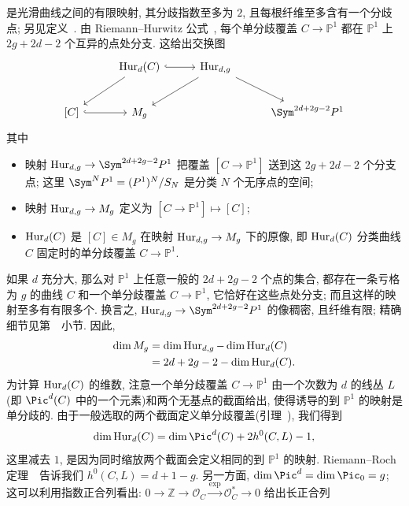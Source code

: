 是光滑曲线之间的有限映射, 其分歧指数至多为 $2$, 且每根纤维至多含有一个分歧点; 另见定义~. 由 Riemann--Hurwitz 公式~, 每个单分歧覆盖 $C\to\mathbb P^1$ 都在 $\mathbb P^1$ 上 $2g+2d-2$ 个互异的点处分支. 这给出交换图
\begin{equation}\label{src:1.1.2}
\begin{tikzcd}[column sep=2.8em,row sep=2.2em]
& \Hur_d(C)\arrow[r,hook]\arrow[dl] & \Hur_{d,g}\arrow[dl]\arrow[dr] &\\
{[C]}\arrow[r,hook] & M_g & & \Sym^{2d+2g-2}\mathbb P^1
\end{tikzcd}
\end{equation}
其中
\begin{itemize}
\item 映射 $\Hur_{d,g}\to\Sym^{2d+2g-2}\mathbb P^1$ 把覆盖 $[C\to\mathbb P^1]$ 送到这 $2g+2d-2$ 个分支点; 这里 $\Sym^N\mathbb P^1=(\mathbb P^1)^N/S_N$ 是分类 $N$ 个无序点的空间; 
\item 映射 $\operatorname{Hur}_{d,g}\to M_g$ 定义为 $[C\to\mathbb P^1]\mapsto[C]$; 
\item $\operatorname{Hur}_d(C)$ 是 $[C]\in M_g$ 在映射 $\operatorname{Hur}_{d,g}\to M_g$ 下的原像, 即 $\operatorname{Hur}_d(C)$ 分类曲线 $C$ 固定时的单分歧覆盖 $C\to\mathbb P^1$.
\end{itemize}
如果 $d$ 充分大, 那么对 $\mathbb P^1$ 上任意一般的 $2d+2g-2$ 个点的集合, 都存在一条亏格为 $g$ 的曲线 $C$ 和一个单分歧覆盖 $C\to\mathbb P^1$, 它恰好在这些点处分支; 而且这样的映射至多有有限多个. 换言之, $\Hur_{d,g}\to\Sym^{2d+2g-2}\mathbb P^1$ 的像稠密, 且纤维有限; 精确细节见第~~小节. 因此, 
\begin{equation}\label{src:1.1.3}
\begin{aligned}
\dim M_g&=\dim\operatorname{Hur}_{d,g}-\dim\operatorname{Hur}_d(C)\\
&=2d+2g-2-\dim\operatorname{Hur}_d(C).
\end{aligned}
\end{equation}
为计算 $\operatorname{Hur}_d(C)$ 的维数, 注意一个单分歧覆盖 $C\to\mathbb P^1$ 由一个次数为 $d$ 的线丛 $L$(即 $\Pic^d(C)$ 中的一个元素)和两个无基点的截面给出, 使得诱导的到 $\mathbb P^1$ 的映射是单分歧的. 由于一般选取的两个截面定义单分歧覆盖(引理~), 我们得到
\begin{equation}\label{src:1.1.4}
\dim\Hur_d(C)=\dim\Pic^d(C)+2h^0(C,L)-1,
\end{equation}
这里减去 $1$, 是因为同时缩放两个截面会定义相同的到 $\mathbb P^1$ 的映射. Riemann--Roch 定理~~告诉我们 $h^0(C,L)=d+1-g$. 另一方面, $\dim\Pic^d=\dim\Pic_0=g$; 这可以利用指数正合列看出: $0\to\mathbb Z\to\mathcal O_C\xrightarrow{\exp}\mathcal O_C^*\to0$ 给出长正合列
